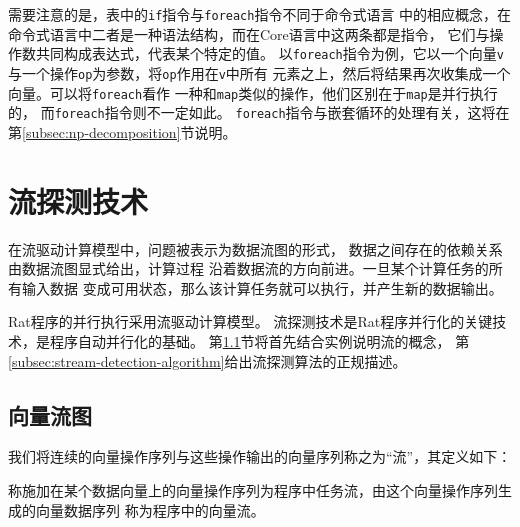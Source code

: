需要注意的是，表中的\texttt{if}指令与\texttt{foreach}指令不同于命令式语言
中的相应概念，在命令式语言中二者是一种语法结构，而在Core语言中这两条都是指令，
它们与操作数共同构成表达式，代表某个特定的值。
以\texttt{foreach}指令为例，它以一个向量\texttt{v}
与一个操作\texttt{op}为参数，将\texttt{op}作用在\texttt{v}中所有
元素之上，然后将结果再次收集成一个向量。可以将\texttt{foreach}看作
一种和\texttt{map}类似的操作，他们区别在于\texttt{map}是并行执行的，
而\texttt{foreach}指令则不一定如此。
\texttt{foreach}指令与嵌套循环的处理有关，这将在第\ref{subsec:np-decomposition}节说明。

\section{流探测技术}\label{sec:stream-detection}
在流驱动计算模型中，问题被表示为数据流图的形式，
数据之间存在的依赖关系由数据流图显式给出，计算过程
沿着数据流的方向前进。一旦某个计算任务的所有输入数据
变成可用状态，那么该计算任务就可以执行，并产生新的数据输出。

Rat程序的并行执行采用流驱动计算模型。
流探测技术是Rat程序并行化的关键技术，是程序自动并行化的基础。
第\ref{subsec:stream-concept}节将首先结合实例说明流的概念，
第\ref{subsec:stream-detection-algorithm}给出流探测算法的正规描述。


\subsection{向量流图}\label{subsec:stream-concept}
我们将连续的向量操作序列与这些操作输出的向量序列称之为“流”，其定义如下：
\begin{definition}
  称施加在某个数据向量上的向量操作序列为程序中任务流，由这个向量操作序列生成的向量数据序列
  称为程序中的向量流。
\end{definition}


